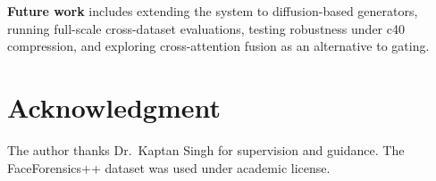 \textbf{Future work} includes extending the system to diffusion-based generators, running full-scale cross-dataset evaluations, testing robustness under c40 compression, and exploring cross-attention fusion as an alternative to gating.

\section*{Acknowledgment}
The author thanks Dr.\ Kaptan Singh for supervision and guidance. The FaceForensics++ dataset was used under academic license.
